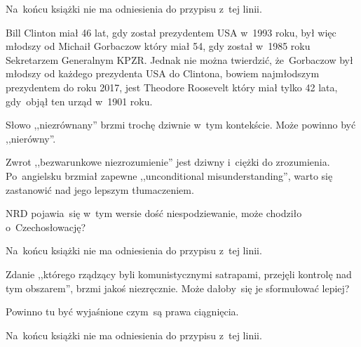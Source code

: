 \documentclass[a4paper,11pt]{article}
\begin{document}
\vspace{\spaceFour}


\start {} Na~końcu książki nie ma odniesienia do przypisu
z~tej linii.

\vspace{\spaceFour}


\start {} Bill Clinton miał 46 lat, gdy został prezydentem USA
w~1993 roku, był więc młodszy od Michaił Gorbaczow który miał 54, gdy
został w~1985 roku Sekretarzem Generalnym KPZR. Jednak nie można
twierdzić, że~Gorbaczow był młodszy od każdego prezydenta USA do
Clintona, bowiem najmłodszym prezydentem do roku 2017, jest Theodore
Roosevelt który miał tylko 42 lata, gdy~objął ten urząd w~1901 roku.

\vspace{\spaceFour}


\start {} Słowo ,,niezrównany'' brzmi trochę dziwnie
w~tym kontekście. Może powinno być ,,nierówny''.

\vspace{\spaceFour}


\start {} Zwrot ,,bezwarunkowe niezrozumienie'' jest
dziwny i~ciężki do zrozumienia. Po~angielsku brzmiał zapewne
,,unconditional misunderstanding'', warto się zastanowić nad jego
lepszym tłumaczeniem.

\vspace{\spaceFour}


\start {} NRD pojawia~się w~tym wersie dość
niespodziewanie, może chodziło o~Czechosłowację?

\vspace{\spaceFour}


\start {} Na~końcu książki nie ma odniesienia do przypisu
z~tej linii.

\vspace{\spaceFour}


\start {} Zdanie ,,którego rządzący byli
komunistycznymi satrapami, przejęli kontrolę nad tym obszarem'', brzmi
jakoś niezręcznie. Może dałoby~się je sformułować lepiej?

\vspace{\spaceFour}


\start {} Powinno tu być wyjaśnione czym~są prawa
ciągnięcia.

\vspace{\spaceFour}


\start {} Na~końcu książki nie ma odniesienia do przypisu
z~tej linii.
\end{document}

